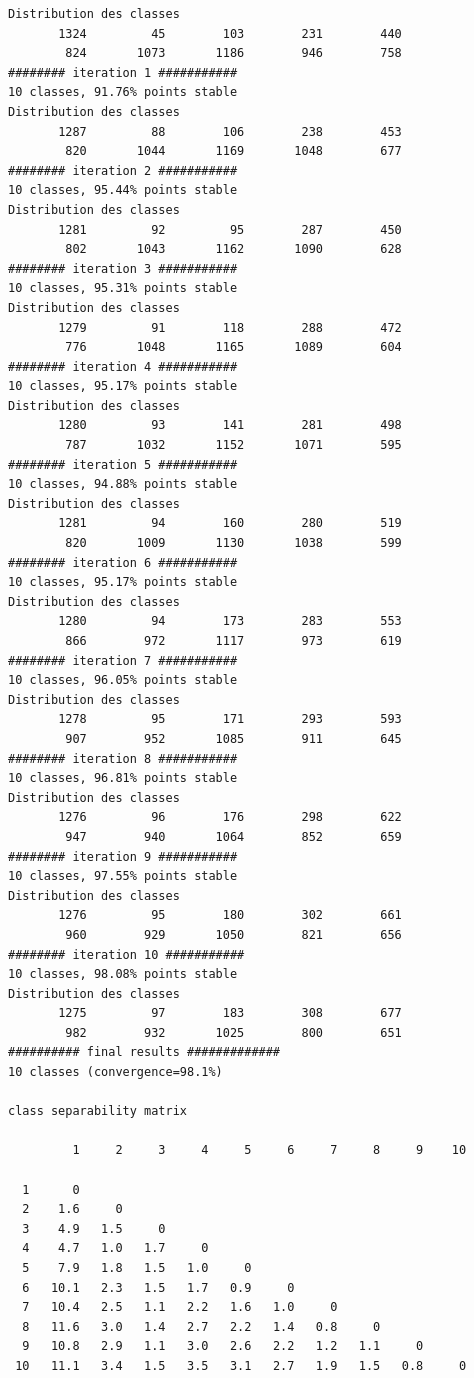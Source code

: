 \documentclass[environments,article,submit,pdftex,moreauthors]{Definitions/mdpi}
\begin{document}
\begin{scriptsize}
\begin{verbatim}
Distribution des classes
       1324         45        103        231        440
        824       1073       1186        946        758
######## iteration 1 ###########
10 classes, 91.76% points stable
Distribution des classes
       1287         88        106        238        453
        820       1044       1169       1048        677
######## iteration 2 ###########
10 classes, 95.44% points stable
Distribution des classes
       1281         92         95        287        450
        802       1043       1162       1090        628
######## iteration 3 ###########
10 classes, 95.31% points stable
Distribution des classes
       1279         91        118        288        472
        776       1048       1165       1089        604
######## iteration 4 ###########
10 classes, 95.17% points stable
Distribution des classes
       1280         93        141        281        498
        787       1032       1152       1071        595
######## iteration 5 ###########
10 classes, 94.88% points stable
Distribution des classes
       1281         94        160        280        519
        820       1009       1130       1038        599
######## iteration 6 ###########
10 classes, 95.17% points stable
Distribution des classes
       1280         94        173        283        553
        866        972       1117        973        619
######## iteration 7 ###########
10 classes, 96.05% points stable
Distribution des classes
       1278         95        171        293        593
        907        952       1085        911        645
######## iteration 8 ###########
10 classes, 96.81% points stable
Distribution des classes
       1276         96        176        298        622
        947        940       1064        852        659
######## iteration 9 ###########
10 classes, 97.55% points stable
Distribution des classes
       1276         95        180        302        661
        960        929       1050        821        656
######## iteration 10 ###########
10 classes, 98.08% points stable
Distribution des classes
       1275         97        183        308        677
        982        932       1025        800        651
########## final results #############
10 classes (convergence=98.1%)

class separability matrix

         1     2     3     4     5     6     7     8     9    10

  1      0
  2    1.6     0
  3    4.9   1.5     0
  4    4.7   1.0   1.7     0
  5    7.9   1.8   1.5   1.0     0
  6   10.1   2.3   1.5   1.7   0.9     0
  7   10.4   2.5   1.1   2.2   1.6   1.0     0
  8   11.6   3.0   1.4   2.7   2.2   1.4   0.8     0
  9   10.8   2.9   1.1   3.0   2.6   2.2   1.2   1.1     0
 10   11.1   3.4   1.5   3.5   3.1   2.7   1.9   1.5   0.8     0


\end{verbatim}
\end{scriptsize}
\end{document}
